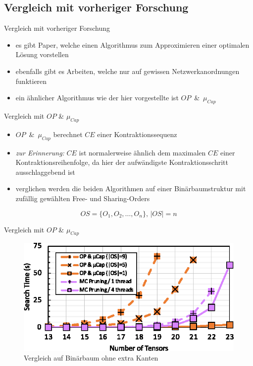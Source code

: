 \documentclass{beamer}
\begin{document}
	\subsection{Vergleich mit vorheriger Forschung}

		\begin{frame}{Vergleich mit vorheriger Forschung}
			\begin{itemize}
				\item es gibt Paper, welche einen Algorithmus zum Approximieren einer optimalen Lösung vorstellen
				\item ebenfalls gibt es Arbeiten, welche nur auf gewissen Netzwerkanordnungen funktieren
				\item ein ähnlicher Algorithmus wie der hier vorgestellte ist \mbox{$OP$ \& $\mu_{Cap}$}\cite{op_mu_cap}
			\end{itemize}
		\end{frame}

		\begin{frame}{Vergleich mit $OP$ \& $\mu_{Cap}$}
			\begin{itemize}
				\item \mbox{$OP$ \& $\mu_{Cap}$} berechnet $CE$ einer Kontraktionssequenz
				\item \textit{zur Erinnerung:} $CE $ ist normalerweise ähnlich dem maximalen $CE$ einer Kontraktionsreihenfolge, da hier der aufwändigste Kontraktionsschritt ausschlaggebend ist \pause
				\item verglichen werden die beiden Algorithmen auf einer Binärbaumstruktur mit zufällig gewählten Free- und Sharing-Orders
			\end{itemize}
			\begin{equation*}
				OS = \{O_1, O_2, \ldots, O_n\} \text{, } |OS| = n
			\end{equation*}
		\end{frame}
		
		\begin{frame}{Vergleich mit $OP$ \& $\mu_{Cap}$}
			\begin{figure}
				\includegraphics[scale=1.3]{figure_14_a}
				\caption*{Vergleich auf Binärbaum ohne extra Kanten}
			\end{figure}
		\end{frame}
\end{document}
